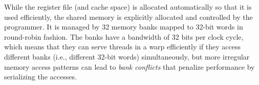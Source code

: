 




While the register file (and cache space) is allocated automatically so that it is used efficiently, the shared memory is explicitly allocated and controlled by the programmer. It is managed by 32 memory banks mapped to 32-bit words in round-robin fashion. The banks have a bandwidth of 32 bits per clock cycle, which means that they can serve threads in a warp efficiently if they access different banks (i.e., different 32-bit words) simultaneously, but more irregular memory access patterns can lead to \emph{bank conflicts} that penalize performance by serializing the accesses.


